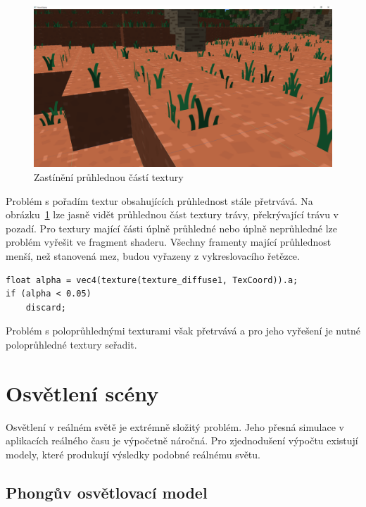 \documentclass[thesis=M,czech]{FITthesis}[2019/12/23]
\begin{document}
\begin{figure}\centering
	\includegraphics[width=\textwidth]{images/alpha_cut_off}
	\caption[Zastínění průhlednou částí textury]{Zastínění průhlednou částí textury}\label{fig:alpha_cut_off}
\end{figure}

Problém s pořadím textur obsahujících průhlednost stále přetrvává. Na obrázku~\ref{fig:alpha_cut_off} lze jasně vidět průhlednou část textury trávy, překrývající trávu v pozadí. Pro textury mající části úplně průhledné nebo úplně neprůhledné lze problém vyřešit ve fragment shaderu. Všechny framenty mající průhlednost menší, než stanovená mez, budou vyřazeny z vykreslovacího řetězce.

\begin{verbatim}
float alpha = vec4(texture(texture_diffuse1, TexCoord)).a;
if (alpha < 0.05)
    discard;
\end{verbatim}

Problém s poloprůhlednými texturami však přetrvává a pro jeho vyřešení je nutné poloprůhledné textury seřadit.



\chapter{Osvětlení scény}

Osvětlení v reálném světě je extrémně složitý problém. Jeho přesná simulace v aplikacích reálného času je výpočetně náročná. Pro zjednodušení výpočtu existují modely, které produkují výsledky podobné reálnému světu.

\section{Phongův osvětlovací model}
\end{document}
